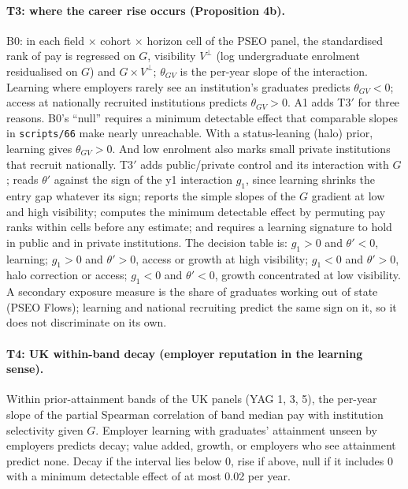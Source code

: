 \paragraph{T3: where the career rise occurs (Proposition 4b).} B0: in each field $\times$ cohort $\times$ horizon
cell of the PSEO panel, the standardised rank of pay is regressed on $G$, visibility $V^\perp$ (log undergraduate
enrolment residualised on $G$) and $G\times V^\perp$; $\theta_{GV}$ is the per-year slope of the interaction.
Learning where employers rarely see an institution's graduates predicts $\theta_{GV}<0$; access at nationally
recruited institutions predicts $\theta_{GV}>0$. A1 adds T3$'$ for three reasons. B0's ``null'' requires a minimum
detectable effect that comparable slopes in \texttt{scripts/66} make nearly unreachable. With a status-leaning
(halo) prior, learning gives $\theta_{GV}>0$. And low enrolment also marks small private institutions that recruit
nationally. T3$'$ adds public/private control and its interaction with $G$; reads $\theta'$ against the sign of the
y1 interaction $g_1$, since learning shrinks the entry gap whatever its sign; reports the simple slopes of the $G$
gradient at low and high visibility; computes the minimum detectable effect by permuting pay ranks within cells
before any estimate; and requires a learning signature to hold in public and in private institutions. The decision
table is: $g_1>0$ and $\theta'<0$, learning; $g_1>0$ and $\theta'>0$, access or growth at high visibility; $g_1<0$
and $\theta'>0$, halo correction or access; $g_1<0$ and $\theta'<0$, growth concentrated at low visibility. A
secondary exposure measure is the share of graduates working out of state (PSEO Flows); learning and national
recruiting predict the same sign on it, so it does not discriminate on its own.

\paragraph{T4: UK within-band decay (employer reputation in the learning sense).} Within prior-attainment bands of
the UK panels (YAG 1, 3, 5), the per-year slope of the partial Spearman correlation of band median pay with
institution selectivity given $G$. Employer learning with graduates' attainment unseen by employers predicts
decay; value added, growth, or employers who see attainment predict none. Decay if the interval lies below 0, rise
if above, null if it includes 0 with a minimum detectable effect of at most 0.02 per year.

